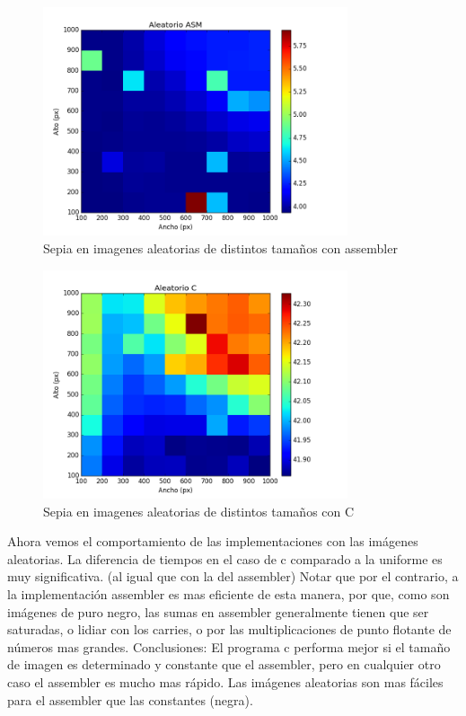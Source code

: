    
    \begin{figure} [H]
  \centering
  \includegraphics[width=0.8\textwidth]{recursos/aleatoriosepiaasm.png}
    \caption{ Sepia en imagenes aleatorias de distintos tamaños con assembler }
\end{figure}
 
 \begin{figure} [H]
  \centering
  \includegraphics[width=0.8\textwidth]{recursos/aleatoriosepiac.png}
    \caption{ Sepia en imagenes aleatorias de distintos tamaños con C }
\end{figure}

   
   \hfill \break
 Ahora vemos el comportamiento de las implementaciones con las imágenes aleatorias. La diferencia de tiempos en el caso de c comparado a la  uniforme es muy significativa. (al igual que con la del assembler) Notar 
que por el contrario, a la implementación assembler es mas eficiente de esta manera,  por que, como son imágenes de puro negro, las sumas en assembler generalmente tienen que ser saturadas, o lidiar con los carries, o por las multiplicaciones de punto flotante de números mas grandes.
\hfill \break
Conclusiones: El programa c performa mejor si el tamaño de imagen es determinado y constante que el assembler, pero en cualquier otro caso el assembler es mucho mas rápido. Las imágenes aleatorias son mas fáciles para el assembler que las constantes (negra). 
\hfill \break
